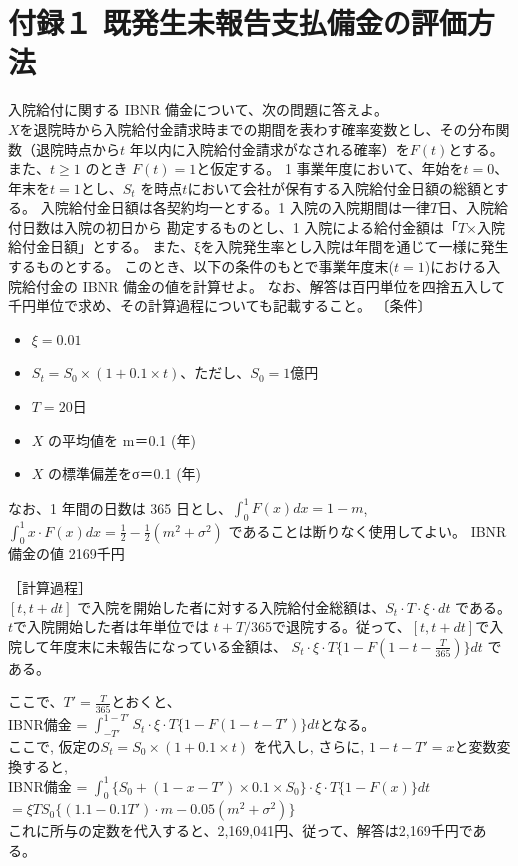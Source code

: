 \documentclass[report,gutter=10mm,fore-edge=10mm,uplatex,dvipdfmx]{jlreq}
\begin{document}
\section{付録１ 既発生未報告支払備金の評価方法}
入院給付に関する IBNR 備金について、次の問題に答えよ。\\
$X$を退院時から入院給付金請求時までの期間を表わす確率変数とし、その分布関数（退院時点から$t$
年以内に入院給付金請求がなされる確率）を$F(t)$とする。また、$t\geq 1$ のとき
$F(t)=1$と仮定する。
1 事業年度において、年始を$t=0$、年末を$t=1$とし、$S_t$ を時点$t$において会社が保有する入院給付金日額の総額とする。
入院給付金日額は各契約均一とする。1 入院の入院期間は一律$T$日、入院給付日数は入院の初日から
勘定するものとし、1 入院による給付金額は「$T$×入院給付金日額」とする。
また、ξを入院発生率とし入院は年間を通じて一様に発生するものとする。
このとき、以下の条件のもとで事業年度末($t=1$)における入院給付金の IBNR 備金の値を計算せよ。
なお、解答は百円単位を四捨五入して千円単位で求め、その計算過程についても記載すること。
〔条件〕
\begin{itemize}
 \item $\xi=0.01$
 \item $S_t=S_0\times(1+0.1\times t)$、ただし、$S_0=1$億円
 \item $T=20$日
 \item $X$ の平均値を m＝0.1 (年)
 \item $X$ の標準偏差をσ＝0.1 (年)
\end{itemize}
なお、1 年間の日数は 365 日とし、$\int_{0}^{1}F(x)dx = 1-m$, $\int_{0}^{1}x\cdot F(x)dx = \frac{1}{2}-\frac{1}{2}(m^2+\sigma^2)$
であることは断りなく使用してよい。
IBNR備金の値 2169千円

［計算過程］\\
$[t, t+dt]$
で入院を開始した者に対する入院給付金総額は、$S_t\cdot T\cdot\xi\cdot dt$
である。
$t$で入院開始した者は年単位では
$t+T/365$で退院する。従って、$[t,t+dt]$で入院して年度末に未報告になっている金額は、
$S_t\cdot\xi\cdot T\{1-F(1-t-\frac{T}{365})\}dt$ である。

ここで、$T'=\frac{T}{365}$とおくと、\\
IBNR備金 = $\int_{-T'}^{1-T'}S_t\cdot\xi\cdot T\{1-F(1-t-T')\}dt$となる。\\
ここで, 仮定の$S_t=S_0\times(1+0.1\times t)$
を代入し, さらに,  $1-t-T'=x$と変数変換すると,\\
IBNR備金 = $\int_{0}^{1}\{S_0+(1-x-T')\times 0.1\times S_0\}\cdot\xi\cdot T\{1-F(x)\}dt$\\
$=\xi TS_0\{(1.1-0.1T')\cdot m-0.05(m^2+\sigma^2)\}$\\
これに所与の定数を代入すると、2,169,041円、従って、解答は2,169千円である。
\end{document}
